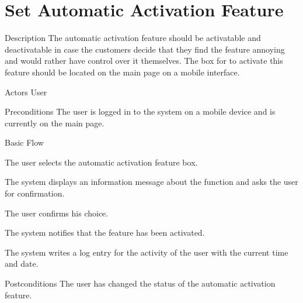 \section{Set Automatic Activation Feature}

%
\begin{cpart}{Description}
The automatic activation feature should be activatable and deactivatable in case the customers decide that they find the feature annoying and would rather have control over it themselves. The box for to activate this feature should be located on the main page on a mobile interface.
\end{cpart}


%
\begin{cpart}{Actors}
User
\end{cpart}

%
\begin{cpart}{Preconditions}
The user is logged in to the system on a mobile device and is currently on the main page.
\end{cpart}

%
\begin{cpartList}{Basic Flow}
  \item The user selects the automatic activation feature box.
  \item The system displays an information message about the function and asks the user for confirmation.
  \item The user confirms his choice.
  \item The system notifies that the feature has been activated.
  \item The system writes a log entry for the activity of the user with the current time and date.
\end{cpartList}

\begin{cpart}{Postconditions}
The user has changed the status of the automatic activation feature.
\end{cpart}

\clearpage
